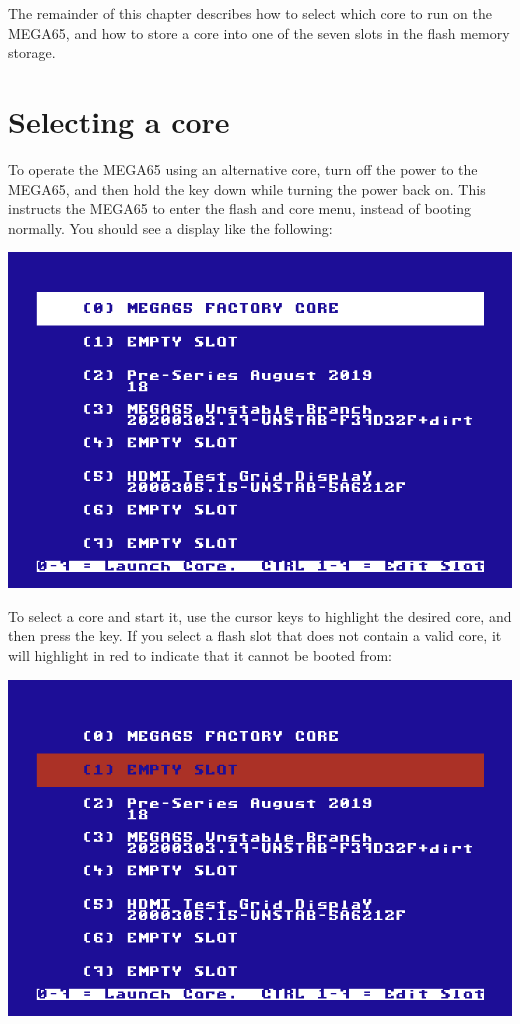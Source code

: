 The remainder of this chapter describes how to select which core to run on the MEGA65, and
how to store a core into one of the seven slots in the flash memory storage.

\section{Selecting a core}

To operate the MEGA65 using an alternative core, turn off the power to the MEGA65, and then hold the
 key down while turning the power back on.  This instructs the MEGA65 to enter the
flash and core menu, instead of booting normally.  You should see a display like the following:

\includegraphics[width=\linewidth]{images/ss-flashmenu.png}

To select a core and start it, use the cursor keys to highlight the desired core, and then press the
 key.  If you select a flash slot that does not
contain a valid core, it will highlight in red to indicate that it
cannot be booted from:

\includegraphics[width=\linewidth]{images/ss-flashmenu-invalidslot.png}

